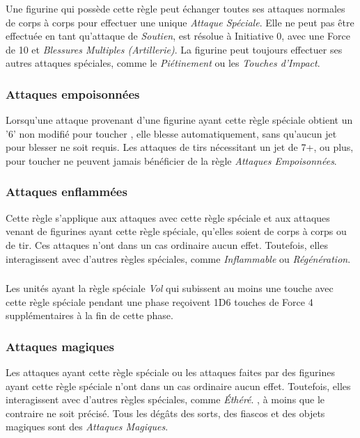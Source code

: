 Une figurine qui possède cette règle peut échanger toutes ses attaques normales de corps à corps pour effectuer une unique \emph{Attaque Spéciale}. Elle ne peut pas être effectuée en tant qu'attaque de \emph{Soutien}, est résolue à Initiative 0, avec une Force de 10 et \emph{Blessures Multiples (Artillerie)}. La figurine peut toujours effectuer ses autres attaques spéciales, comme le \emph{Piétinement} ou les \emph{Touches d'Impact}.

\subsubsection*{Attaques empoisonnées}

Lorsqu'une attaque provenant d'une figurine ayant cette règle spéciale obtient un '6' non modifié pour toucher , elle blesse automatiquement, sans qu'aucun jet pour blesser ne soit requis. Les attaques de tirs nécessitant un jet de 7+, ou plus, pour toucher ne peuvent jamais bénéficier de la règle \emph{Attaques Empoisonnées}.

\subsubsection*{Attaques enflammées}

Cette règle s'applique aux attaques avec cette règle spéciale et aux attaques venant de figurines ayant cette règle spéciale, qu'elles soient de corps à corps ou de tir. Ces attaques n'ont dans un cas ordinaire aucun effet. Toutefois, elles interagissent avec d'autres règles spéciales, comme \emph{Inflammable} ou \emph{Régénération}.

\subsubsection*{}

Les unités ayant la règle spéciale \emph{Vol} qui subissent au moins une touche avec cette règle spéciale pendant une phase reçoivent 1D6 touches de Force 4 supplémentaires à la fin de cette phase.

\subsubsection*{Attaques magiques}

Les attaques ayant cette règle spéciale ou les attaques faites par des figurines ayant cette règle spéciale n'ont dans un cas ordinaire aucun effet. Toutefois, elles interagissent avec d'autres règles spéciales, comme \emph{Éthéré}. , à moins que le contraire ne soit précisé. Tous les dégâts des sorts, des fiascos et des objets magiques sont des \emph{Attaques Magiques}.

